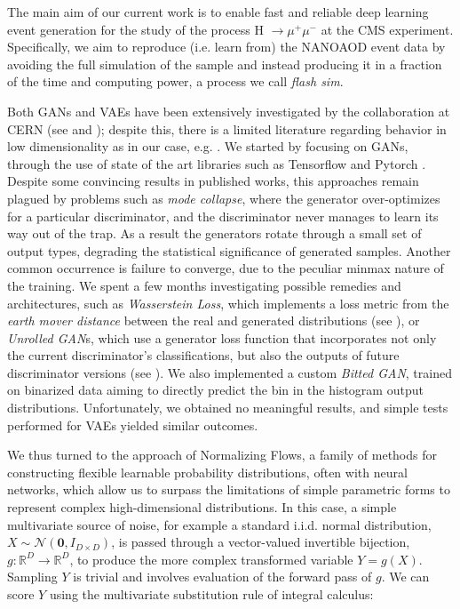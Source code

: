 \documentclass{scrartcl} %
\begin{document}
	The main aim of our current work is to enable fast and reliable  deep learning event generation for the study of the process H $\xrightarrow{} \mu^+ \mu^-$ at the CMS experiment. Specifically, we aim to reproduce (i.e. learn from) the NANOAOD event data \cite{2019EPJWC.21406021R} by avoiding the full simulation of the sample and instead producing it in a fraction of the time and computing power, a process we call \emph{flash sim}.
	
	Both GANs and VAEs have been extensively investigated by the collaboration at CERN (see \cite{2019glhc} and \cite{otten2021event}); despite this, there is a limited literature regarding behavior in low dimensionality as in our case, e.g. \cite{523096}. We started by focusing on GANs, through the use of state of the art libraries such as Tensorflow \cite{tensorflow2015-whitepaper} and Pytorch \cite{NEURIPS2019_9015}. Despite some convincing results in published works, this approaches remain plagued by problems such as \emph{mode collapse}, where the generator over-optimizes for a particular discriminator, and the discriminator never manages to learn its way out of the trap. As a result the generators rotate through a small set of output types, degrading the statistical significance of generated samples. Another common occurrence is failure to converge, due to the peculiar minmax nature of the training.
	We spent a few months investigating possible remedies and architectures, such as \emph{Wasserstein Loss}, which implements a loss metric from the \emph{earth mover distance} between the real and generated distributions (see \cite{arjovsky2017wasserstein}), or \emph{Unrolled GAN}s, which use a generator loss function that incorporates not only the current discriminator's classifications, but also the outputs of future discriminator versions (see \cite{metz2017unrolled}). We also implemented a custom \emph{Bitted GAN}, trained on binarized data aiming to directly predict the bin in the histogram output distributions.
	Unfortunately, we obtained no meaningful results, and simple tests performed for VAEs yielded similar outcomes.
	
	We thus turned to the approach of Normalizing Flows, a family of methods for constructing flexible learnable probability distributions, often with neural networks, which allow us to surpass the limitations of simple parametric forms to represent complex high-dimensional distributions. In this case, a simple multivariate source of noise, for example a standard i.i.d. normal distribution, $X\sim\mathcal{N}(\mathbf{0},I_{D\times D})$, is passed through a vector-valued invertible bijection, $g:\mathbb{R}^D\rightarrow\mathbb{R}^D$, to produce the more complex transformed variable $Y=g(X)$.
	Sampling $Y$ is trivial and involves evaluation of the forward pass of $g$. We can score $Y$ using the multivariate substitution rule of integral calculus:
	
\end{document}
